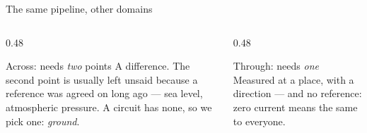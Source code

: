 \documentclass[11pt,aspectratio=169]{beamer}
\begin{document}
\begin{frame}{The same pipeline, other domains}
  \begin{columns}[T,onlytextwidth]
    \begin{column}{0.48\textwidth}
      \begin{block}{Across: needs \emph{two} points}
        \small A difference. The second point is usually left unsaid because a reference
        was agreed on long ago --- sea level, atmospheric pressure. A circuit has none,
        so we pick one: \emph{ground}.
      \end{block}
    \end{column}
    \begin{column}{0.48\textwidth}
      \begin{block}{Through: needs \emph{one}}
        \small Measured at a place, with a direction --- and no reference: zero current
        means the same to everyone.
      \end{block}
    \end{column}
  \end{columns}
  \vfill
\end{frame}

\end{document}
